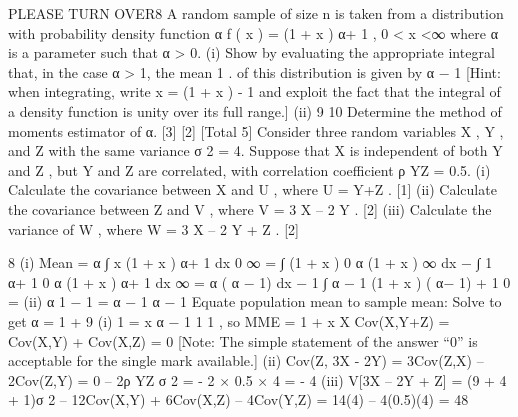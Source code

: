 PLEASE TURN OVER8
A random sample of size n is taken from a distribution with probability density
function
α
f ( x ) =
(1 + x ) α+ 1
,
0 < x <∞
where α is a parameter such that α > 0.
(i)
Show by evaluating the appropriate integral that, in the case α > 1, the mean
1
.
of this distribution is given by
α − 1
[Hint: when integrating, write x = (1 + x ) - 1 and exploit the fact that the
integral of a density function is unity over its full range.]
(ii)
9
10
Determine the method of moments estimator of α.
[3]
[2]
[Total 5]
Consider three random variables X , Y , and Z with the same variance σ 2 = 4. Suppose
that X is independent of both Y and Z , but Y and Z are correlated, with correlation
coefficient ρ YZ = 0.5.
(i) Calculate the covariance between X and U , where U = Y+Z . [1]
(ii) Calculate the covariance between Z and V , where V = 3 X – 2 Y . [2]
(iii) Calculate the variance of W , where W = 3 X – 2 Y + Z .
[2]

8
(i)
Mean =
α
∫ x (1 + x ) α+ 1 dx
0
∞
=
∫ (1 + x )
0
α
(1 + x )
∞
dx − ∫ 1
α+ 1
0
α
(1 + x ) α+ 1
dx
∞
=
α
( α − 1)
dx − 1
∫
α − 1 (1 + x ) ( α− 1) + 1
0
=
(ii)
α
1
− 1 =
α − 1
α − 1
Equate population mean to sample mean:
Solve to get α = 1 +
9
(i)
1
= x
α − 1
1
1
, so MME = 1 +
x
X
Cov(X,Y+Z) = Cov(X,Y) + Cov(X,Z) = 0
[Note: The simple statement of the answer “0” is acceptable for the single
mark available.]
(ii) Cov(Z, 3X - 2Y) = 3Cov(Z,X) – 2Cov(Z,Y) = 0 – 2ρ YZ σ 2
= - 2 × 0.5 × 4 = - 4
(iii) V[3X – 2Y + Z] = (9 + 4 + 1)σ 2 – 12Cov(X,Y) + 6Cov(X,Z) – 4Cov(Y,Z)
= 14(4) – 4(0.5)(4) = 48
